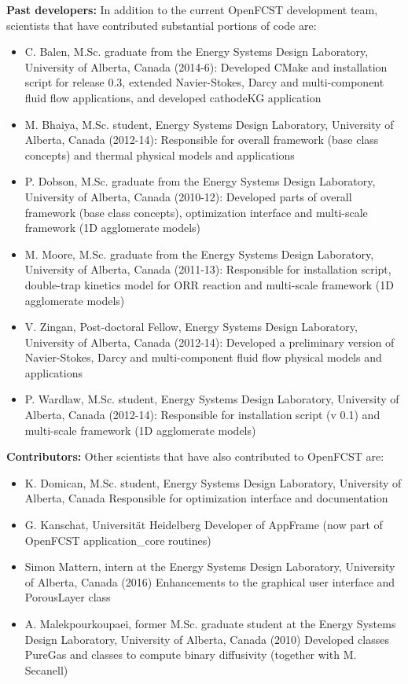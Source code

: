 \textbf{Past developers:} In addition to the current OpenFCST development team, scientists that have contributed substantial portions of code are:
\begin{itemize}
\item C. Balen, M.Sc. graduate from the Energy Systems Design Laboratory, University of Alberta, Canada (2014-6): Developed CMake and installation script for release 0.3, extended Navier-Stokes, Darcy and multi-component fluid flow applications, and developed cathodeKG application
 \item M. Bhaiya, M.Sc. student, Energy Systems Design Laboratory, University of Alberta, Canada (2012-14): Responsible for overall framework (base class concepts) and thermal physical models and applications    
\item P. Dobson, M.Sc. graduate from the Energy Systems Design Laboratory, University of Alberta, Canada (2010-12): Developed parts of overall framework (base class concepts), optimization interface and multi-scale framework (1D agglomerate models)
\item M. Moore, M.Sc. graduate from the Energy Systems Design Laboratory, University of Alberta, Canada (2011-13): Responsible for installation script, double-trap kinetics model for ORR reaction and multi-scale framework (1D agglomerate models)
\item V. Zingan, Post-doctoral Fellow, Energy Systems Design Laboratory, University of Alberta, Canada (2012-14): Developed a preliminary version of Navier-Stokes, Darcy and multi-component fluid flow physical models and applications
\item P. Wardlaw, M.Sc. student, Energy Systems Design Laboratory, University of Alberta, Canada (2012-14): Responsible for installation script (v 0.1) and multi-scale framework (1D agglomerate models)
\end{itemize}
     
\textbf{Contributors:} Other scientists that have also contributed to OpenFCST are:
\begin{itemize}
\item K. Domican, M.Sc. student, Energy Systems Design Laboratory, University of Alberta, Canada 
   \subitem Responsible for optimization interface and documentation
\item G. Kanschat, Universität Heidelberg
  \subitem Developer of AppFrame (now part of OpenFCST application\_core routines)
\item Simon Mattern, intern at the Energy Systems Design Laboratory, University of Alberta, Canada (2016)
  \subitem Enhancements to the graphical user interface and PorousLayer class
 \item A. Malekpourkoupaei, former M.Sc. graduate student at the Energy Systems Design Laboratory, University of Alberta, Canada (2010)
    \subitem Developed classes PureGas and classes to compute binary diffusivity (together with M. Secanell)
\end{itemize}

